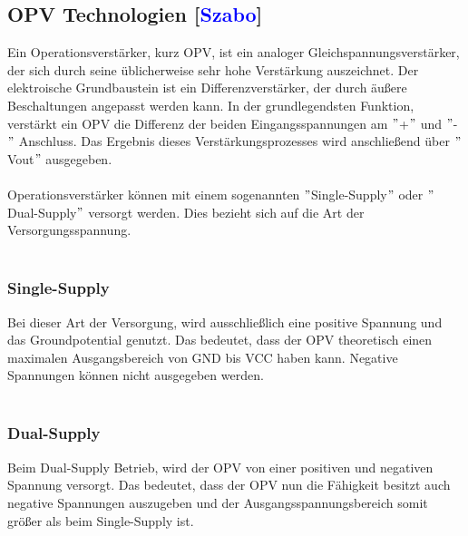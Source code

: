 \documentclass[titlepage,12pt,twoside]{article}
\begin{document}
\subsection{OPV Technologien [\textcolor{blue}{Szabo}]}
\label{chap:OPV Technologien}
Ein Operationsverstärker, kurz OPV, ist ein analoger Gleichspannungsverstärker, der sich durch seine üblicherweise sehr hohe 
Verstärkung auszeichnet. Der elektroische Grundbaustein ist ein Differenzverstärker, der durch äußere Beschaltungen angepasst werden kann.
In der grundlegendsten Funktion, verstärkt ein OPV die Differenz der beiden Eingangsspannungen am $"$+$"$ und $"$-$"$ Anschluss. Das Ergebnis
dieses Verstärkungsprozesses wird anschließend über $"$Vout$"$ ausgegeben. \\
\\
Operationsverstärker können mit einem sogenannten $"$Single-Supply$"$ oder $"$Dual-Supply$"$ versorgt werden. Dies bezieht sich auf
die Art der Versorgungsspannung. \\
\\
\subsubsection{Single-Supply}
Bei dieser Art der Versorgung, wird ausschließlich eine positive Spannung und das Groundpotential genutzt. Das bedeutet, dass der OPV
theoretisch einen maximalen Ausgangsbereich von GND bis VCC haben kann. Negative Spannungen können nicht ausgegeben werden. \\
\\

\subsubsection{Dual-Supply}
Beim Dual-Supply Betrieb, wird der OPV von einer positiven und negativen Spannung versorgt. Das bedeutet, dass der OPV nun die Fähigkeit
besitzt auch negative Spannungen auszugeben und der Ausgangsspannungsbereich somit größer als beim Single-Supply ist.
\end{document}
